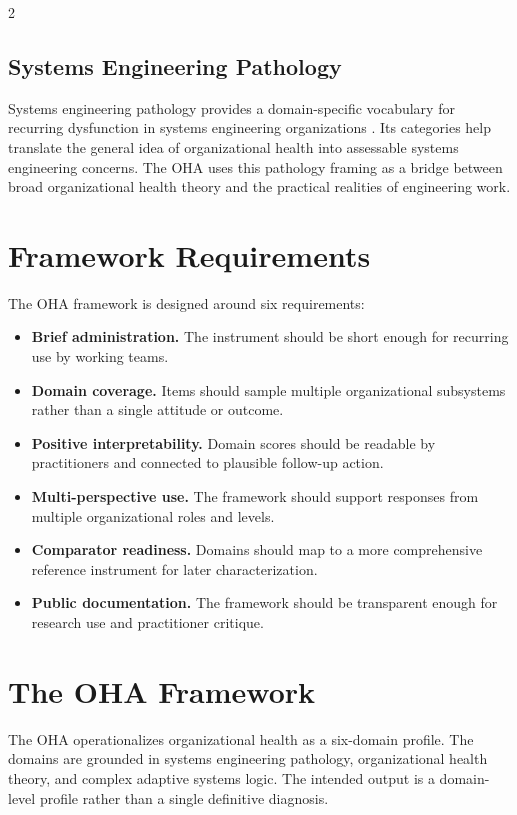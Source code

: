 \documentclass[11pt,letterpaper]{article}
\begin{document}
\begin{multicols*}{2}
\subsection{Systems Engineering Pathology}
Systems engineering pathology provides a domain-specific vocabulary for recurring dysfunction in systems engineering organizations \parencite{davidz2018}. Its categories help translate the general idea of organizational health into assessable systems engineering concerns. The OHA uses this pathology framing as a bridge between broad organizational health theory and the practical realities of engineering work.

\section{Framework Requirements}
The OHA framework is designed around six requirements:

\begin{itemize}
  \item \textbf{Brief administration.} The instrument should be short enough for recurring use by working teams.
  \item \textbf{Domain coverage.} Items should sample multiple organizational subsystems rather than a single attitude or outcome.
  \item \textbf{Positive interpretability.} Domain scores should be readable by practitioners and connected to plausible follow-up action.
  \item \textbf{Multi-perspective use.} The framework should support responses from multiple organizational roles and levels.
  \item \textbf{Comparator readiness.} Domains should map to a more comprehensive reference instrument for later characterization.
  \item \textbf{Public documentation.} The framework should be transparent enough for research use and practitioner critique.
\end{itemize}

\section{The OHA Framework}
The OHA operationalizes organizational health as a six-domain profile. The domains are grounded in systems engineering pathology, organizational health theory, and complex adaptive systems logic. The intended output is a domain-level profile rather than a single definitive diagnosis.


\end{multicols*}
\end{document}
